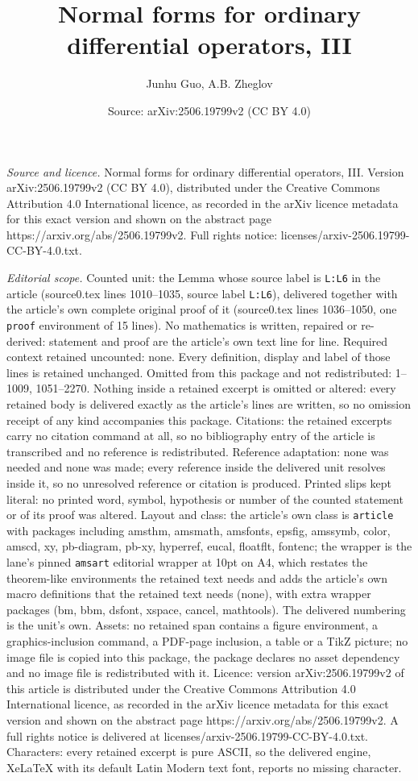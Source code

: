 \documentclass[10pt,a4paper]{amsart}
\title[Normal forms for ordinary differential operators, III]{Normal forms for ordinary differential operators, III}
\author{Junhu Guo, A.B. Zheglov}
\date{Source: arXiv:2506.19799v2 (CC BY 4.0)}
\begin{document}
\maketitle

\noindent\emph{Source and licence.} Normal forms for ordinary differential operators, III. Version arXiv:2506.19799v2 (CC BY 4.0), distributed under the Creative Commons Attribution 4.0 International licence, as recorded in the arXiv licence metadata for this exact version and shown on the abstract page https://arxiv.org/abs/2506.19799v2. Full rights notice: licenses/arxiv-2506.19799-CC-BY-4.0.txt.\par\smallskip

\noindent\textit{Editorial scope.} Counted unit: the Lemma whose source label is \texttt{L:L6} in the article (source0.tex lines 1010--1035, source label \texttt{L:L6}), delivered together with the article's own complete original proof of it (source0.tex lines 1036--1050, one \texttt{proof} environment of 15 lines). No mathematics is written, repaired or re-derived: statement and proof are the article's own text line for line. Required context retained uncounted: none. Every definition, display and label of those lines is retained unchanged. Omitted from this package and not redistributed: 1--1009, 1051--2270. Nothing inside a retained excerpt is omitted or altered: every retained body is delivered exactly as the article's lines are written, so no omission receipt of any kind accompanies this package. Citations: the retained excerpts carry no citation command at all, so no bibliography entry of the article is transcribed and no reference is redistributed. Reference adaptation: none was needed and none was made; every reference inside the delivered unit resolves inside it, so no unresolved reference or citation is produced. Printed slips kept literal: no printed word, symbol, hypothesis or number of the counted statement or of its proof was altered. Layout and class: the article's own class is \texttt{article} with packages including amsthm, amsmath, amsfonts, epsfig, amssymb, color, amscd, xy, pb-diagram, pb-xy, hyperref, eucal, floatflt, fontenc; the wrapper is the lane's pinned \texttt{amsart} editorial wrapper at 10pt on A4, which restates the theorem-like environments the retained text needs and adds the article's own macro definitions that the retained text needs (none), with extra wrapper packages (bm, bbm, dsfont, xspace, cancel, mathtools). The delivered numbering is the unit's own. Assets: no retained span contains a figure environment, a graphics-inclusion command, a PDF-page inclusion, a table or a TikZ picture; no image file is copied into this package, the package declares no asset dependency and no image file is redistributed with it. Licence: version arXiv:2506.19799v2 of this article is distributed under the Creative Commons Attribution 4.0 International licence, as recorded in the arXiv licence metadata for this exact version and shown on the abstract page https://arxiv.org/abs/2506.19799v2. A full rights notice is delivered at licenses/arxiv-2506.19799-CC-BY-4.0.txt. Characters: every retained excerpt is pure ASCII, so the delivered engine, XeLaTeX with its default Latin Modern text font, reports no missing character.
\end{document}
